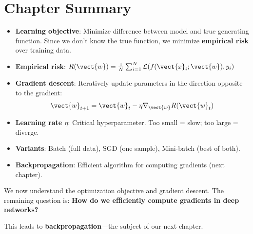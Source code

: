 
\section{Chapter Summary}

\begin{itemize}
    \item \textbf{Learning objective}: Minimize difference between model and true generating function. Since we don't know the true function, we minimize \textbf{empirical risk} over training data.
    
    \item \textbf{Empirical risk}: $R(\vect{w}) = \frac{1}{N} \sum_{i=1}^{N} \mathcal{L}(f(\vect{x}_i; \vect{w}), y_i)$
    
    \item \textbf{Gradient descent}: Iteratively update parameters in the direction opposite to the gradient:
    \[
    \vect{w}_{t+1} = \vect{w}_t - \eta \nabla_{\vect{w}} R(\vect{w}_t)
    \]
    
    \item \textbf{Learning rate $\eta$}: Critical hyperparameter. Too small = slow; too large = diverge.
    
    \item \textbf{Variants}: Batch (full data), SGD (one sample), Mini-batch (best of both).
    
    \item \textbf{Backpropagation}: Efficient algorithm for computing gradients (next chapter).
\end{itemize}

\begin{bluebox}
We now understand the optimization objective and gradient descent. The remaining question is: \textbf{How do we efficiently compute gradients in deep networks?}

This leads to \textbf{backpropagation}---the subject of our next chapter.
\end{bluebox}
